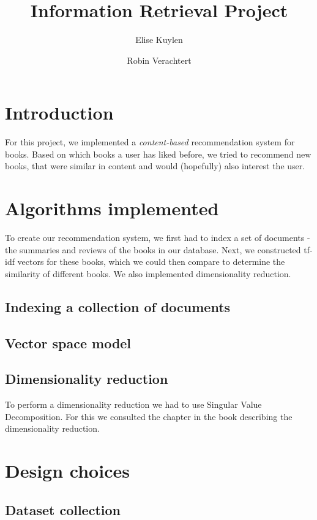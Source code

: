 \documentclass[10pt,a4paper]{paper}
\author{Elise Kuylen \and Robin Verachtert}
\title{Information Retrieval Project}
\begin{document}
\maketitle

\section{Introduction}

For this project, we implemented a \textit{content-based} recommendation system for books. Based on which books a user has liked before, we tried to recommend new books, that were similar in content and would (hopefully) also interest the user.

\section{Algorithms implemented}

To create our recommendation system, we first had to index a set of documents - the summaries and reviews of the books in our database. Next, we constructed tf-idf vectors for these books, which we could then compare to determine the similarity of different books. We also implemented dimensionality reduction. %

\subsection{Indexing a collection of documents}

\subsection{Vector space model}

\subsection{Dimensionality reduction}
To perform a dimensionality reduction we had to use Singular Value Decomposition. For this we consulted the chapter in the book describing the dimensionality reduction.  %

\section{Design choices}

\subsection{Dataset collection}
\end{document}
